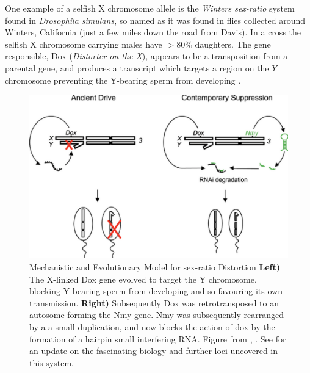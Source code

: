 {One example of a selfish X
chromosome allele is the {\it Winters sex-ratio} system found in {\it Drosophila
  simulans}, so named as it was found in flies collected around Winters, California (just a
few miles down the road from Davis). In a cross the selfish X
chromosome carrying males have  $>80\%$ daughters. The gene
responsible, Dox ({\it Distorter on the X}), appears to be a transposition
from a parental gene, and produces a transcript which targets a region
on the $Y$ chromosome preventing the Y-bearing sperm from developing
\citet[see Figure \ref{fig:winters_sperm} from][]{tao2007sexII}. 


  \begin{figure}
\begin{center}
\includegraphics[width= \textwidth]{Journal_figs/single_locus_selection/Winters_sex_ratio_drive/Ferree_Barbash_dox_cartoon.png}
\end{center}
\caption{Mechanistic and Evolutionary Model for sex-ratio Distortion
{\bf Left)} The X-linked Dox gene evolved to target the Y chromosome, blocking
Y-bearing sperm from developing and so favouring its own
transmission. {\bf Right)} Subsequently Dox was retrotransposed to an
autosome forming the Nmy gene. Nmy was subsequently rearranged by a
a small duplication, and now blocks the action of dox by the formation
of a hairpin small interfering RNA. Figure from
\citet{ferree2007distorted}, \PLOSccBY. See \citet
{lin2018hprna} for an update on the fascinating biology and further
loci uncovered in this system.} \label{fig:dox_cartoon}
\end{figure}

}
